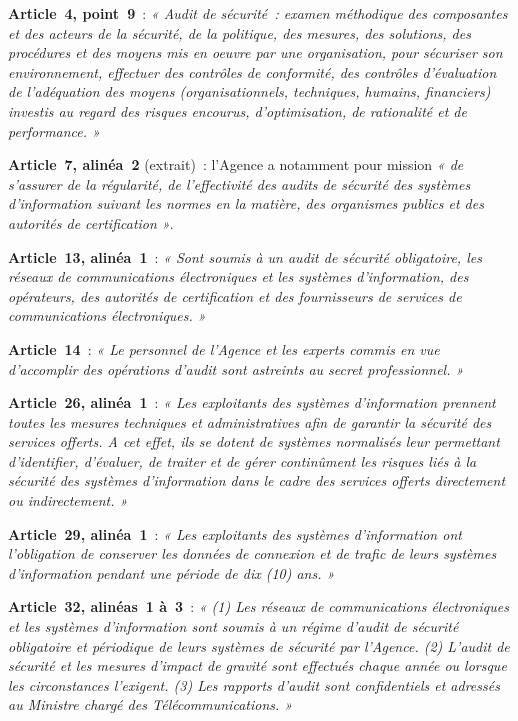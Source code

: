\begin{boxjuris}
\textbf{Article~4, point~9}~: \textit{« Audit de sécurité~: examen
méthodique des composantes et des acteurs de la sécurité, de la politique,
des mesures, des solutions, des procédures et des moyens mis en oeuvre par
une organisation, pour sécuriser son environnement, effectuer des contrôles
de conformité, des contrôles d'évaluation de l'adéquation des moyens
(organisationnels, techniques, humains, financiers) investis au regard des
risques encourus, d'optimisation, de rationalité et de performance. »}

\medskip
\textbf{Article~7, alinéa~2} (extrait)~: l'Agence a notamment pour mission
\textit{« de s'assurer de la régularité, de l'effectivité des audits de
sécurité des systèmes d'information suivant les normes en la matière, des
organismes publics et des autorités de certification »}.

\medskip
\textbf{Article~13, alinéa~1}~: \textit{« Sont soumis à un audit de sécurité
obligatoire, les réseaux de communications électroniques et les systèmes
d'information, des opérateurs, des autorités de certification et des
fournisseurs de services de communications électroniques. »}

\medskip
\textbf{Article~14}~: \textit{« Le personnel de l'Agence et les experts
commis en vue d'accomplir des opérations d'audit sont astreints au secret
professionnel. »}

\medskip
\textbf{Article~26, alinéa~1}~: \textit{« Les exploitants des systèmes
d'information prennent toutes les mesures techniques et administratives afin
de garantir la sécurité des services offerts. A cet effet, ils se dotent de
systèmes normalisés leur permettant d'identifier, d'évaluer, de traiter et
de gérer continûment les risques liés à la sécurité des systèmes
d'information dans le cadre des services offerts directement ou
indirectement. »}

\medskip
\textbf{Article~29, alinéa~1}~: \textit{« Les exploitants des systèmes
d'information ont l'obligation de conserver les données de connexion et de
trafic de leurs systèmes d'information pendant une période de dix (10)
ans. »}

\medskip
\textbf{Article~32, alinéas~1 à~3}~: \textit{« (1) Les réseaux de
communications électroniques et les systèmes d'information sont soumis à un
régime d'audit de sécurité obligatoire et périodique de leurs systèmes de
sécurité par l'Agence. (2) L'audit de sécurité et les mesures d'impact de
gravité sont effectués chaque année ou lorsque les circonstances
l'exigent. (3) Les rapports d'audit sont confidentiels et adressés au
Ministre chargé des Télécommunications. »}


\end{boxjuris}
